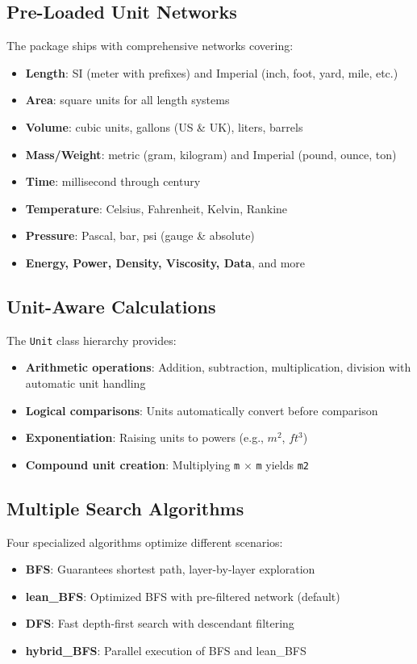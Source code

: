 \documentclass[11pt,a4paper]{report}
\begin{document}
\subsection{Pre-Loaded Unit Networks}
The package ships with comprehensive networks covering:
\begin{itemize}[leftmargin=*]
  \item \textbf{Length}: SI (meter with prefixes) and Imperial (inch, foot, yard, mile, etc.)
  \item \textbf{Area}: square units for all length systems
  \item \textbf{Volume}: cubic units, gallons (US \& UK), liters, barrels
  \item \textbf{Mass/Weight}: metric (gram, kilogram) and Imperial (pound, ounce, ton)
  \item \textbf{Time}: millisecond through century
  \item \textbf{Temperature}: Celsius, Fahrenheit, Kelvin, Rankine
  \item \textbf{Pressure}: Pascal, bar, psi (gauge \& absolute)
  \item \textbf{Energy, Power, Density, Viscosity, Data}, and more
\end{itemize}

\subsection{Unit-Aware Calculations}
The \texttt{Unit} class hierarchy provides:
\begin{itemize}[leftmargin=*]
  \item \textbf{Arithmetic operations}: Addition, subtraction, multiplication, division with automatic unit handling
  \item \textbf{Logical comparisons}: Units automatically convert before comparison
  \item \textbf{Exponentiation}: Raising units to powers (e.g., $m^2$, $ft^3$)
  \item \textbf{Compound unit creation}: Multiplying \texttt{m} × \texttt{m} yields \texttt{m2}
\end{itemize}

\subsection{Multiple Search Algorithms}
Four specialized algorithms optimize different scenarios:
\begin{itemize}[leftmargin=*]
  \item \textbf{BFS}: Guarantees shortest path, layer-by-layer exploration
  \item \textbf{lean\_BFS}: Optimized BFS with pre-filtered network (default)
  \item \textbf{DFS}: Fast depth-first search with descendant filtering
  \item \textbf{hybrid\_BFS}: Parallel execution of BFS and lean\_BFS
\end{itemize}
\end{document}
